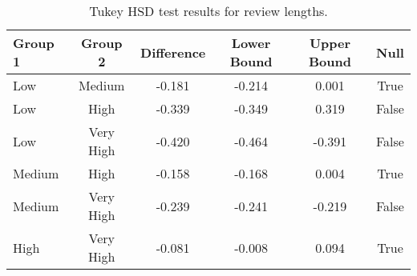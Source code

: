 \begin{table}[htbp]
    \centering
    \begin{tabular}{lccccc}
        \toprule
        \textbf{Group 1} & \textbf{Group 2} & \textbf{Difference} & \textbf{Lower Bound} & \textbf{Upper Bound} & \textbf{Null} \\
        \midrule
        Low & Medium & -0.181 & -0.214 & 0.001 & True \\
        Low & High & -0.339 & -0.349 & 0.319 & False \\
        Low & Very High & -0.420   & -0.464 & -0.391 & False \\
        Medium & High & -0.158 & -0.168 & 0.004 & True \\
        Medium & Very High & -0.239 & -0.241 & -0.219 & False \\
        High & Very High & -0.081 & -0.008 & 0.094 & True \\
        \bottomrule
    \end{tabular}
    \caption{Tukey HSD test results for review lengths.}
    \label{tab:tukey_hsd_reviews}
\end{table}



